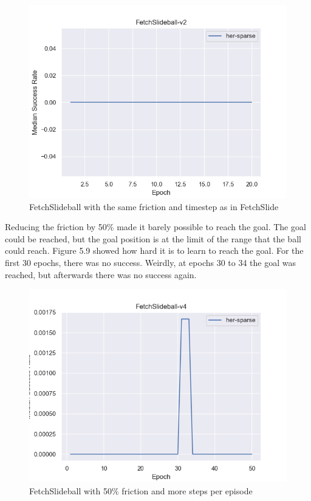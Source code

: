  
\begin{figure} [h]
	
	\centering
	\includegraphics[width=1\textwidth]{figures/fig_FetchSlideball-v2.png}
	\caption{FetchSlideball with the same friction and timestep as in FetchSlide}
	
\end{figure}

Reducing the friction by 50\% made it barely possible to reach the goal. The goal could be reached, but the goal position is at the limit of the range that the ball could reach. Figure 5.9 showed how hard it is to learn to reach the goal. For the first 30 epochs, there was no success. Weirdly, at epochs 30 to 34 the goal was reached, but afterwards there was no success again. 



\begin{figure} [h]
	
	\centering
	\includegraphics[width=1\textwidth]{figures/fig_FetchSlideball-v4.png}
	\caption{FetchSlideball with 50\% friction and more steps per episode}
	
\end{figure}

